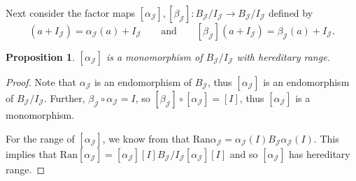 \documentclass[pdftex]{sigma}
\newcommand{\fancyJ}{\mathcal{J}}
\numberwithin{equation}{section}
\newtheorem{Proposition}[Theorem]{Proposition}
 { \theoremstyle{definition}
\newtheorem{Definition}[Theorem]{Definition}
\newtheorem{Note}[Theorem]{Note}
\newtheorem{Example}[Theorem]{Example}
\newtheorem{Remark}[Theorem]{Remark} }
\begin{document}
Next consider the factor maps $[\alpha_\fancyJ],[\beta_\fancyJ]\colon B_\fancyJ/I_\fancyJ \to B_\fancyJ/I_\fancyJ$ defined by
\begin{equation*}
[\alpha_\fancyJ](a+I_\fancyJ) = \alpha_\fancyJ(a)+I_\fancyJ\qquad\text{and}\qquad [\beta_\fancyJ](a+I_\fancyJ)=\beta_\fancyJ(a)+I_\fancyJ.
\end{equation*}
\begin{Proposition}
$[\alpha_\fancyJ]$ is a monomorphism of $B_\fancyJ/I_\fancyJ$ with hereditary range.
\end{Proposition}
\begin{proof}
Note that $\alpha_\fancyJ$ is an endomorphism of $B_\fancyJ$, thus $[\alpha_\fancyJ]$ is an endomorphism of $B_\fancyJ/I_\fancyJ$. Further, $\beta_\fancyJ \circ \alpha_\fancyJ = I$, so $[\beta_\fancyJ]\circ[\alpha_\fancyJ]=[I]$, thus $[\alpha_\fancyJ]$ is a monomorphism.

For the range of $[\alpha_\fancyJ]$, we know from \cite{HKMP3} that
$
\mathrm{Ran} \alpha_\fancyJ = \alpha_\fancyJ(I)B_\fancyJ \alpha_\fancyJ(I)$.
This implies that
$
 \mathrm{Ran} [\alpha_\fancyJ] = [\alpha_\fancyJ][I]B_\fancyJ/I_\fancyJ [\alpha_\fancyJ][I]
$
and so $[\alpha_\fancyJ]$ has hereditary range.
\end{proof}
\end{document}
